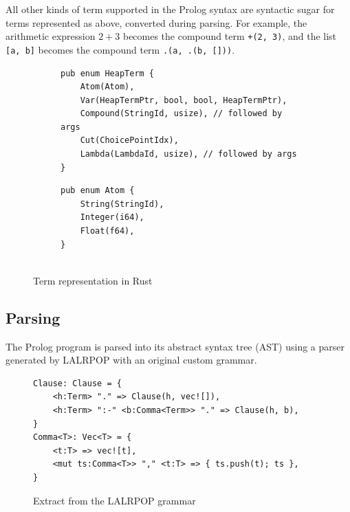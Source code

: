 \vspace*{-1.5em}

All other kinds of term supported in the Prolog syntax are syntactic sugar for terms represented as above, converted during parsing. For example, the arithmetic expression $2 + 3$ becomes the compound term \texttt{+(2, 3)}, and the list \texttt{[a, b]} becomes the compound term \texttt{.(a, .(b, []))}.

\begin{figure}[H]
\centering
\begin{subfigure}{0.7\textwidth}
\centering
\begin{verbatim}
pub enum HeapTerm {
    Atom(Atom),
    Var(HeapTermPtr, bool, bool, HeapTermPtr),
    Compound(StringId, usize), // followed by args
    Cut(ChoicePointIdx),
    Lambda(LambdaId, usize), // followed by args
}
\end{verbatim}
\end{subfigure}%
\begin{subfigure}{0.3\textwidth}
\centering
\begin{verbatim}
pub enum Atom {
    String(StringId),
    Integer(i64),
    Float(f64),
}


\end{verbatim}
\end{subfigure}
\caption{Term representation in Rust}
\label{fig:rust-term-representation}
\end{figure}

\subsection{Parsing}

The Prolog program is parsed into its abstract syntax tree (AST) using a parser generated by LALRPOP \cite{thelalrpopprojectdevelopersLALRPOPhttpsgithubcom2015} with an original custom grammar.

\begin{figure}[H]
\centering
\begin{verbatim}
Clause: Clause = {
    <h:Term> "." => Clause(h, vec![]),
    <h:Term> ":-" <b:Comma<Term>> "." => Clause(h, b),
}
Comma<T>: Vec<T> = {
    <t:T> => vec![t],
    <mut ts:Comma<T>> "," <t:T> => { ts.push(t); ts },
}
\end{verbatim}
\caption{Extract from the LALRPOP grammar}
\label{fig:grammar}
\end{figure}

\vspace*{-1.5em}

